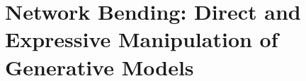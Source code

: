 \chapter{Network Bending: Direct and Expressive Manipulation of Generative Models}
\label{ch:net_bend}


